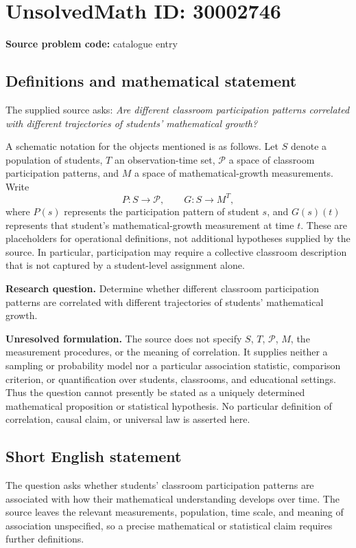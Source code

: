 \documentclass[11pt]{article}
\begin{document}
\section*{UnsolvedMath ID: 30002746}
\textbf{Source problem code:} catalogue entry
\subsection{Definitions and mathematical statement}
The supplied source asks: \emph{Are different classroom participation patterns correlated with different trajectories of students' mathematical growth?}

A schematic notation for the objects mentioned is as follows. Let \(S\) denote a population of students, \(T\) an observation-time set, \(\mathcal P\) a space of classroom participation patterns, and \(M\) a space of mathematical-growth measurements. Write
\[
P:S\longrightarrow\mathcal P,
\qquad
G:S\longrightarrow M^T,
\]
where \(P(s)\) represents the participation pattern of student \(s\), and \(G(s)(t)\) represents that student's mathematical-growth measurement at time \(t\). These are placeholders for operational definitions, not additional hypotheses supplied by the source. In particular, participation may require a collective classroom description that is not captured by a student-level assignment alone.

\textbf{Research question.} Determine whether different classroom participation patterns are correlated with different trajectories of students' mathematical growth.

\textbf{Unresolved formulation.} The source does not specify \(S\), \(T\), \(\mathcal P\), \(M\), the measurement procedures, or the meaning of correlation. It supplies neither a sampling or probability model nor a particular association statistic, comparison criterion, or quantification over students, classrooms, and educational settings. Thus the question cannot presently be stated as a uniquely determined mathematical proposition or statistical hypothesis. No particular definition of correlation, causal claim, or universal law is asserted here.
\subsection{Short English statement}
The question asks whether students' classroom participation patterns are associated with how their mathematical understanding develops over time. The source leaves the relevant measurements, population, time scale, and meaning of association unspecified, so a precise mathematical or statistical claim requires further definitions.
\end{document}
